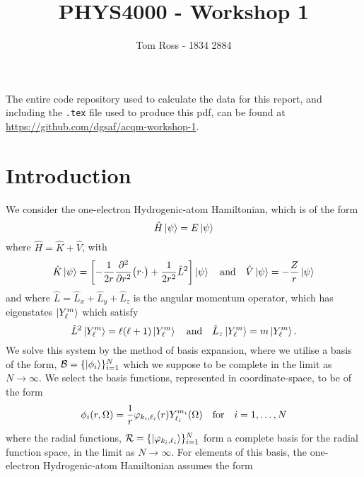 \documentclass[]{article}
\title{PHYS4000 - Workshop 1}
\author{Tom Ross - 1834 2884}
\date{}
\begin{document}
The entire code repository used to calculate the data for this report, and
including the \lstinline[style=ff]{.tex} file used to produce this pdf, can be
found at \url{https://github.com/dgsaf/acqm-workshop-1}.

\section{Introduction}
\label{sec:introduction}

We consider the one-electron Hydrogenic-atom Hamiltonian, which is of the form
\begin{equation*}
  \hat{H}
  \ket{\psi}
  =
  E
  \ket{\psi}
\end{equation*}
where $\hat{H} = \hat{K} + \hat{V}$, with
\begin{equation*}
  \hat{K}
  \ket{\psi}
  =
  \lrsq[\bigg]
  {
    -
    \dfrac{1}{2 r}
    \pdv[2]{r}
    \lr[\big]
    {
      r
      \cdot
    }
    +
    \dfrac{1}{2 r^{2}}
    \hat{L}^{2}
  }
  \ket{\psi}
  \qq{and}
  \hat{V}
  \ket{\psi}
  =
  -
  \dfrac{Z}{r}
  \ket{\psi}
\end{equation*}
and where $\hat{L} = \hat{L}_{x} + \hat{L}_{y} + \hat{L}_{z}$ is the angular
momentum operator, which has eigenstates $\ket{Y_{\ell}^{m}}$ which satisfy
\begin{equation*}
  \hat{L}^{2}
  \ket{Y_{\ell}^{m}}
  =
  \ell
  \lr{\ell + 1}
  \ket{Y_{\ell}^{m}}
  \qq{and}
  \hat{L}_{z}
  \ket{Y_{\ell}^{m}}
  =
  m
  \ket{Y_{\ell}^{m}}
  .
\end{equation*}
We solve this system by the method of basis expansion, where we utilise a basis
of the form, $\mathcal{B} = \lbrace\ket{\phi_{i}}\rbrace_{i = 1}^{N}$ which we suppose
to be complete in the limit as $N \to \infty$.
We select the basis functions, represented in coordinate-space, to be of the
form
\begin{equation*}
  \phi_{i}\lr{r, \Omega}
  =
  \dfrac{1}{r}
  \varphi_{k_{i}, \ell_{i}}\lr{r}
  Y_{\ell_{i}}^{m_{i}}\lr{\Omega}
  \qq{for}
  i = 1, \dotsc, N
\end{equation*}
where the radial functions,
$\mathcal{R} = \lbrace\ket{\varphi_{k_{i}, \ell_{i}}}\rbrace_{i = 1}^{N}$ form a
complete basis for the radial function space, in the limit as $N \to \infty$.
For elements of this basis, the one-electron Hydrogenic-atom Hamiltonian assumes
the form
\end{document}
